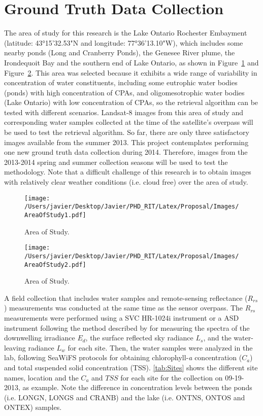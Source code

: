 \section{Ground Truth Data Collection}
The area of study for this research is the Lake Ontario Rochester Embayment (latitude: 43°15'32.53"N and longitude: 77°36'13.10"W), which includes some nearby ponds (Long and Cranberry Ponds), the Genesee River plume, the Irondequoit Bay and the southern end of Lake Ontario, as shown in Figure~\ref{fig:areaofstudy1} and Figure~\ref{fig:areaofstudy2}. This area was selected because it exhibits a wide range of variability in concentration of water constituents, including some eutrophic water bodies (ponds) with high concentration of CPAs, and oligomesotrophic water bodies (Lake Ontario) with low concentration of CPAs, so the retrieval algorithm can be tested with different scenarios. Landsat-8 images from this area of study and corresponding water samples collected at the time of the satellite's overpass will be used to test the retrieval algorithm. So far, there are only three satisfactory images available from the summer 2013. This project contemplates performing one new ground truth data collection during 2014. Therefore, images from the 2013-2014 spring and summer collection seasons will be used to test the methodology. Note that a difficult challenge of this research is to obtain images with relatively clear weather conditions (i.e. cloud free) over the area of study.
\begin{figure}[htb]
  \centering
  \texttt{[image: /Users/javier/Desktop/Javier/PHD\_RIT/Latex/Proposal/Images/AreaOfStudy1.pdf]}
  \caption{Area of Study. \label{fig:areaofstudy1} } 
\end{figure}
\begin{figure}[htb]
  \centering
  \texttt{[image: /Users/javier/Desktop/Javier/PHD\_RIT/Latex/Proposal/Images/AreaOfStudy2.pdf]}
  \caption{Area of Study. \label{fig:areaofstudy2} } 
\end{figure}
A field collection that includes water samples and remote-sensing reflectance ($R_{rs}$) measurements was conducted at the same time as the sensor overpass. The $R_{rs}$ measurements were performed using a SVC HR-1024i instrument\cite{SVCHR1024i} or a ASD instrument following the method described by \cite{Mobley:1999} for measuring the spectra of the downwelling irradiance $E_d$, the surface reflected sky radiance $L_s$, and the water-leaving radiance $L_w$ for each site. Then, the water samples were analyzed in the lab, following SeaWiFS protocols\cite{Mueller1995} for obtaining chlorophyll-{\it a} concentration ($C_a$) and total suspended solid concentration (TSS). \autoref{tab:Sites} shows the different site names, location and the $C_a$ and $TSS$ for each site for the collection on 09-19-2013, as example. Note the difference in concentration levels between the ponds (i.e. LONGN, LONGS and CRANB) and the lake (i.e. ONTNS, ONTOS and ONTEX) samples.

